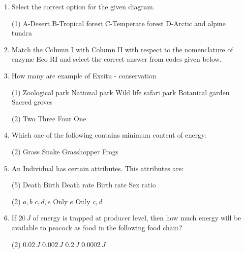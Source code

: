 \documentclass[twocolumn]{article}
\begin{document}
\begin{enumerate}
    \item Select the correct option for the given diagram.
    \begin{center}
    \end{center}
    \begin{tasks}(1)
        \task A-Desert
        \task B-Tropical forest
        \task C-Temperate forest
        \task D-Arctic and alpine tundra
    \end{tasks}

    \item Match the Column I with Column II with respect to the nomenclature of enzyme Eco RI and select the correct answer from codes given below.

    \item How many are example of Exsitu - conservation
    \begin{tasks}(1)
        \task Zoological park
        \task National park
        \task Wild life safari park
        \task Botanical garden
        \task Sacred groves
    \end{tasks}
    \begin{tasks}(2)
        \task Two
        \task Three
        \task Four
        \task One
    \end{tasks}

    \item Which one of the following contains minimum content of energy:
    \begin{tasks}(2)
        \task Grass
        \task Snake
        \task Grasshopper
        \task Frogs
    \end{tasks}

    \item An Individual has certain attributes. This attributes are:
    \begin{tasks}(5)
        \task Death
        \task Birth
        \task Death rate
        \task Birth rate
        \task Sex ratio
    \end{tasks}
    \begin{tasks}(2)
        \task \(a, b\)
        \task \(c, d, e\)
        \task Only \(e\)
        \task Only \(c, d\)
    \end{tasks}

    \item If \(20 \, J\) of energy is trapped at producer level, then how much energy will be available to peacock as food in the following food chain?
    \begin{tasks}(2)
        \task \(0.02 \, J\)
        \task \(0.002 \, J\)
        \task \(0.2 \, J\)
        \task \(0.0002 \, J\)
    \end{tasks}


\end{enumerate}
\end{document}
